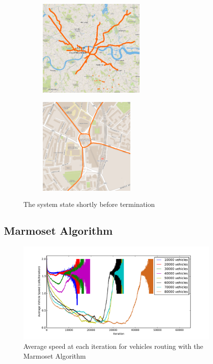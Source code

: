 \documentclass[ %
                    author={Alexander Hill},
                supervisor={Dr. Benjamin Sach},
                    degree={MEng},
                     title={MARMOSET},
                  subtitle={Multi-Agent Route Management using Online Simulation for Efficient Transportation},
                      type={research},
                      year={2016} ]{dissertation}
\begin{document}
\begin{figure}[h]
\centering
\begin{subfigure}[b]{0.4\textwidth}
    \centering
    \includegraphics[height=13em]{dij-60k-blocked-wide}
\end{subfigure}
\hspace{1em}
\begin{subfigure}[b]{0.4\textwidth}
    \centering
    \includegraphics[height=13em]{dij-60k-blocked-close}
\end{subfigure}
\caption{The system state shortly before termination}\label{fig:dijkstra-wtf}
\end{figure}

\subsection{Marmoset Algorithm}\label{sec:marmoset-eval}

\begin{figure}[p]
    \centering
    \includegraphics[width=0.9\textwidth]{sdv-speed}
    \caption{Average speed at each iteration for vehicles routing with the Marmoset Algorithm}\label{fig:sdv-speed}
\end{figure}
\end{document}
